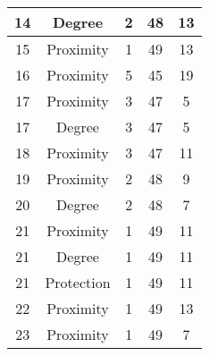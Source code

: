 \documentclass[results.tex]{subfiles}
\begin{document}
\begin{center}
\begin{tabular}{| c || c | c | c | c |}
            \hline
            14                      & Degree                       & 2                      & 48                      & 13                   \\
            \hline
            15                      & Proximity                    & 1                      & 49                      & 13                   \\
            \hline
            16                      & Proximity                    & 5                      & 45                      & 19                   \\
            \hline
            17                      & Proximity                    & 3                      & 47                      & 5                    \\
            \hline
            17                      & Degree                       & 3                      & 47                      & 5                    \\
            \hline
            18                      & Proximity                    & 3                      & 47                      & 11                   \\
            \hline
            19                      & Proximity                    & 2                      & 48                      & 9                    \\
            \hline
            20                      & Degree                       & 2                      & 48                      & 7                    \\
            \hline
            21                      & Proximity                    & 1                      & 49                      & 11                   \\
            \hline
            21                      & Degree                       & 1                      & 49                      & 11                   \\
            \hline
            21                      & Protection                   & 1                      & 49                      & 11                   \\
            \hline
            22                      & Proximity                    & 1                      & 49                      & 13                   \\
            \hline
            23                      & Proximity                    & 1                      & 49                      & 7                    \\

\end{tabular}
\end{center}
\end{document}
